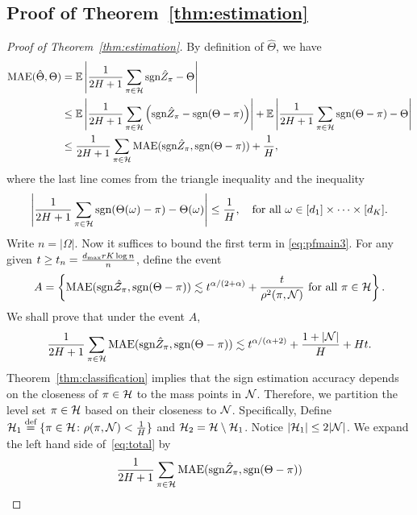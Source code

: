 \documentclass[11pt]{article}
\theoremstyle{plain}
\theoremstyle{definition}
\def\sign{\textup{sgn}}
\begin{document}
\subsection{Proof of Theorem~\ref{thm:estimation}}
\begin{proof}[Proof of Theorem~\ref{thm:estimation}]
By definition of $\hat\Theta$, we have
\begin{align}\label{eq:pfmain3}\nonumber
\text{MAE}(\hat\Theta,\Theta) &= \mathbb{E}\left|\frac{1}{2H+1}\sum_{\pi\in\tH}\sign\hat Z_\pi-\Theta\right|\\\nonumber
&\leq \mathbb{E}\left|\frac{1}{2H+1}\sum_{\pi\in\tH}\left(\sign\hat Z_\pi-\sign(\Theta-\pi)\right)\right|+\mathbb{E}\left|\frac{1}{2H+1}\sum_{\pi\in\tH}\sign(\Theta-\pi)-\Theta\right|\\&
\leq \frac{1}{2H+1}\sum_{\pi\in\tH}\text{MAE}(\sign\hat Z_\pi,\sign(\Theta-\pi))+\frac{1}{H},
\end{align}
where the last line comes  from the triangle inequality and the inequality
\begin{equation}
\left|\frac{1}{2H+1}\sum_{\pi\in\tH}\sign(\Theta(\omega)-\pi)-\Theta(\omega)\right|\leq \frac{1}{H},\quad\text{for all } \omega\in[d_1]\times\cdots\times[d_K] .
\end{equation}
Write $n=|\Omega|$. Now it suffices to bound  the first term in \eqref{eq:pfmain3}.  
For any given $t\geq t_n={d_{\max}rK\log n \over n}$, define the event
\begin{align}
A = \left\{\text{MAE}(\sign \hat \tZ_\pi,\sign(\Theta-\pi))\lesssim t^{\alpha/(2+\alpha)}+ \frac{t}{\rho^2(\pi,\tN)}\text{ for all } \pi\in\tH\right\}.
\end{align}
We shall prove that under the event $A$,
\begin{equation}\label{eq:total}
{1\over 2H+1}\sum_{\pi \in \tH} \textup{MAE}(\sign \hat Z_\pi, \sign (\Theta-\pi)) \lesssim  t^{\alpha/(\alpha+2)}+{1+|\tN|\over H}+ H t.
\end{equation}
Theorem~\ref{thm:classification} implies that the  sign estimation accuracy depends on the closeness of $\pi\in \mathcal{H}$ to the mass points in $\mathcal{N}$. Therefore, we partition the level set $\pi \in \mathcal{H}$ based on their closeness to $\mathcal{N}$. Specifically, Define $\mathcal{H}_1 \stackrel{\text{def}}{=}\{\pi\in\mathcal{H}\colon \rho(\pi,\mathcal{N})<\frac{1}{H}\}$ and $\mathcal{H}_2 = \mathcal{H}\setminus\mathcal{H}_1$.   Notice $|\mathcal{H}_1|\leq 2|\mathcal{N}|$.  We expand the left hand side of~\eqref{eq:total} by
\begin{align}\label{eq:twobounds}
&{1\over 2H+1}\sum_{\pi \in \tH} \textup{MAE}(\sign \hat Z_\pi, \sign (\Theta-\pi))\notag \\

\end{align}
\end{proof}
\end{document}
